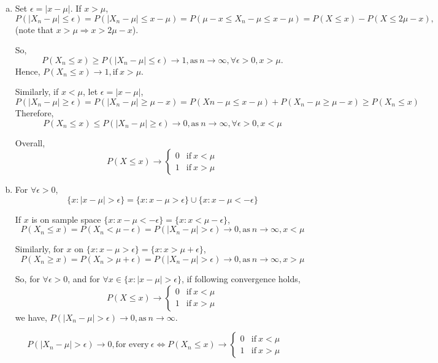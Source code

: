 \documentclass[letterpaper]{article}
\begin{document}
    \begin{enumerate}[(a)]
    \item Set $\epsilon = |x-\mu|$. If $x > \mu$,
    \[
    P(|X_n - \mu| \le \epsilon) = P(|X_n - \mu| \le x-\mu) = P(\mu-x \le X_n-\mu \le x-\mu) = P(X\le x) - P(X \le 2\mu-x), 
    \]
    (note that $x > \mu \Rightarrow x > 2\mu-x$).

    So,
    \[
    P(X_n \le x) \ge P(|X_n -\mu| \le \epsilon) \to 1, \text{as}~ n \to \infty, \forall \epsilon > 0, x > \mu.
    \]
    Hence, $P(X_n \le x) \to 1, \text{if}~ x > \mu$.

    Similarly, if $x < \mu$, let $\epsilon = |x-\mu|$,
    \[
    P(|X_n - \mu| \ge \epsilon) = P(|X_n - \mu| \ge \mu -x) = P(Xn-\mu \le x-\mu) + P(X_n - \mu \ge \mu - x) \ge P(X_n \le x)
    \]
    Therefore,
    \[
    P(X_n \le x) \le P(|X_n - \mu| \ge \epsilon) \to 0, \text{as}~ n \to \infty, \forall \epsilon > 0, x < \mu
    \]

    Overall,
    \[
    P(X \le x) \to \begin{cases}
    0 & \text{if}~ x < \mu \\
    1 & \text{if}~ x > \mu
    \end{cases}
    \]

    \item For $\forall \epsilon > 0$,
    \[
    \{x: |x-\mu| > \epsilon\} = \{x: x - \mu > \epsilon\} \cup \{x: x - \mu < -\epsilon\}
    \]

    If $x$ is on sample space $\{x:x-\mu < -\epsilon\} = \{x: x < \mu - \epsilon\}$, 
    \[
    P(X_n \le x) = P(X_n < \mu - \epsilon) = P(|X_n - \mu| > \epsilon) \to 0, \text{as}~ n \to \infty, x < \mu
    \]

    Similarly, for $x$ on $\{x: x-\mu > \epsilon\} = \{x: x > \mu + \epsilon\}$,
    \[
    P(X_n \ge x) = P(X_n > \mu + \epsilon) = P(|X_n - \mu| > \epsilon) \to 0, \text{as}~ n \to \infty, x > \mu
    \]

    So, for $\forall \epsilon > 0$, and for $\forall x \in \{x: |x-\mu| > \epsilon\}$, if following convergence holds,
    \[
    P(X \le x) \to \begin{cases}
    0 & \text{if}~ x < \mu \\
    1 & \text{if}~ x > \mu
    \end{cases}
    \]
    we have, $P(|X_n - \mu| > \epsilon) \to 0, \text{as}~ n \to \infty$.

    \end{enumerate}
    \[
    P(|X_n - \mu| > \epsilon) \to 0, \text{for every}~\epsilon \iff P(X_n \le x) \to \begin{cases}
    0 & \text{if}~ x < \mu \\
    1 & \text{if}~ x > \mu
    \end{cases}
    \]
\end{document}
